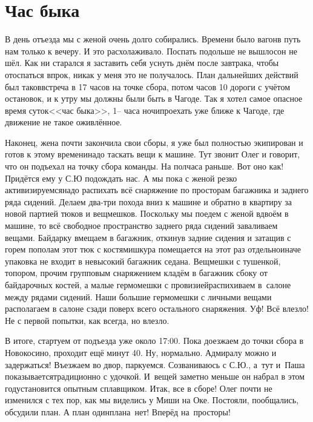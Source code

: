 \chapter{Час быка} 
\vepsianrose

В день отъезда мы с женой очень долго собирались. Времени было вагон\mdash в путь нам только к вечеру. И это расхолаживало. Поспать подольше не вышло\mdash сон не шёл. Как ни старался я заставить себя уснуть днём после завтрака, чтобы отоспаться впрок, никак у меня это не получалось. План дальнейших действий был таков\mdash встреча в 17 часов на точке сбора, потом часов 10 дороги с учётом остановок, и к утру мы должны были быть в Чагоде. Так я хотел самое опасное время суток\mdash <<час быка>>, 1\thinspace\nobreakdash-- часа ночи\mdash проехать уже ближе к Чагоде, где движение не такое оживлённое. 

Наконец, жена почти закончила свои сборы, я уже был полностью экипирован и готов к этому времени\mdash надо таскать вещи к машине. Тут звонит Олег и говорит, что он подъехал на точку сбора команды. На полчаса раньше. Вот оно как! Придётся ему у С.Ю подождать нас. А мы пока с женой резко активизируемся\mdash надо распихать всё снаряжение по просторам багажника и заднего ряда сидений. Делаем два-три похода вниз к машине и обратно в квартиру за новой партией тюков и вещмешков. Поскольку мы поедем с женой вдвоём в машине, то всё свободное пространство заднего ряда сидений заваливаем вещами. Байдарку вмещаем в багажник, откинув задние сидения и затащив с горем пополам этот тюк с костями\mdash шкура помещается на этот раз отдельно\mdash иначе упаковка не входит в невысокий багажник седана. Вещмешки с тушенкой, топором, прочим групповым снаряжением кладём в багажник сбоку от байдарочных костей, а малые гермомешки с провизией\mdash распихиваем в~салоне между рядами сидений. Наши большие гермомешки с личными вещами располагаем в салоне сзади поверх всего остального снаряжения. Уф! Всё влезло! Не с первой попытки, как всегда, но влезло. 

В итоге, стартуем от подъезда уже около 17:00. Пока доезжаем до точки сбора в Новокосино, проходит ещё минут 40. Ну, нормально. Адмиралу можно и задержаться! Въезжаем во двор, паркуемся. Созваниваюсь с С.Ю., а~тут и~Паша показывается\mdash традиционно с удочкой. И~вещей заметно меньше он набрал в этом году\mdash становится опытным сплавщиком. Итак, все в сборе! Олег почти не изменился с тех пор, как мы виделись у Миши на Оке. Постояли, пообщались, обсудили план. А план один\mdash плана~нет! Вперёд на~просторы! 

